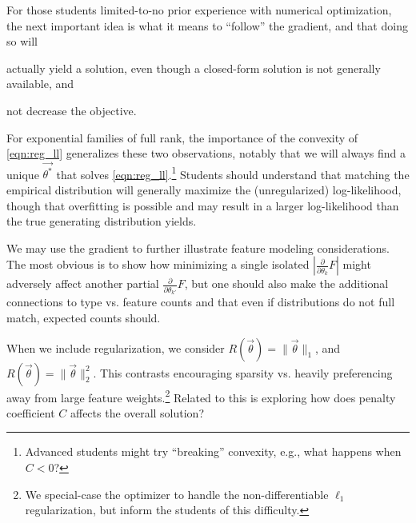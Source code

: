 \documentclass[11pt,letterpaper]{article}
\begin{document}
For those students limited-to-no prior experience with numerical optimization, the next 
important idea is what it means to ``follow'' the gradient, and that doing so will 
\begin{inparaenum}[i)]
\item actually yield a solution, even though a closed-form solution is not generally available, and
\item not decrease the objective.
\end{inparaenum}
For exponential families of full rank, the importance of the convexity of \eqref{eqn:reg_ll} generalizes these two observations, 
notably that we will always find a unique $\vec{\theta^*}$ that solves 
\eqref{eqn:reg_ll}.\footnote{Advanced students might try ``breaking'' convexity, e.g., what happens when $C < 0$?}
Students should understand that matching the empirical distribution will generally maximize the (unregularized) log-likelihood, 
though that overfitting is possible and may result in a larger log-likelihood than the true generating distribution yields.

We may use the gradient to further illustrate feature modeling considerations. The most obvious is to show how 
minimizing a single isolated $|\frac{\partial}{\partial \theta_k} F|$ might adversely affect another partial 
$\frac{\partial}{\partial \theta_{k'}}F$, but one should also make the additional connections to type vs. feature counts 
and that even if distributions do not full match, expected counts should.

When we include regularization, we consider $R(\vec{\theta}) = \|\vec\theta\|_1$, and 
$R(\vec{\theta}) = \|\vec{\theta}\|_2^2$. This contrasts encouraging sparsity vs.  
heavily preferencing away from large feature weights.\footnote{We special-case the optimizer 
to handle the non-differentiable $\ell_1$ regularization, but inform the students of this difficulty.} 
Related to this is exploring how does  penalty coefficient $C$ affects the overall solution?
\end{document}
